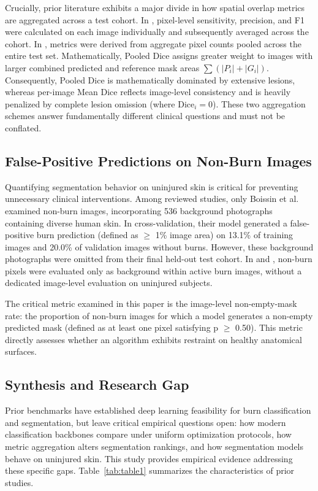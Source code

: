 \documentclass[11pt,a4paper]{article}
\begin{document}
Crucially, prior literature exhibits a major divide in how spatial overlap metrics are aggregated across a test cohort. In \cite{boissin2023}, pixel-level sensitivity, precision, and F1 were calculated on each image individually and subsequently averaged across the cohort. In \cite{liu2021}, metrics were derived from aggregate pixel counts pooled across the entire test set. Mathematically, Pooled Dice assigns greater weight to images with larger combined predicted and reference mask areas $\sum (|P_i| + |G_i|)$. Consequently, Pooled Dice is mathematically dominated by extensive lesions, whereas per-image Mean Dice reflects image-level consistency and is heavily penalized by complete lesion omission (where $\text{Dice}_i = 0$). These two aggregation schemes answer fundamentally different clinical questions and must not be conflated.

\subsection{False-Positive Predictions on Non-Burn Images}

Quantifying segmentation behavior on uninjured skin is critical for preventing unnecessary clinical interventions. Among reviewed studies, only Boissin et al. \cite{boissin2023} examined non-burn images, incorporating 536 background photographs containing diverse human skin. In cross-validation, their model generated a false-positive burn prediction (defined as $\ge$ 1\% image area) on 13.1\% of training images and 20.0\% of validation images without burns. However, these background photographs were omitted from their final held-out test cohort. In \cite{liu2021} and \cite{sevik2026}, non-burn pixels were evaluated only as background within active burn images, without a dedicated image-level evaluation on uninjured subjects.

The critical metric examined in this paper is the image-level non-empty-mask rate: the proportion of non-burn images for which a model generates a non-empty predicted mask (defined as at least one pixel satisfying p $\ge$ 0.50). This metric directly assesses whether an algorithm exhibits restraint on healthy anatomical surfaces.

\subsection{Synthesis and Research Gap}

Prior benchmarks have established deep learning feasibility for burn classification and segmentation, but leave critical empirical questions open: how modern classification backbones compare under uniform optimization protocols, how metric aggregation alters segmentation rankings, and how segmentation models behave on uninjured skin. This study provides empirical evidence addressing these specific gaps. Table~\ref{tab:table1} summarizes the characteristics of prior studies.
\end{document}
